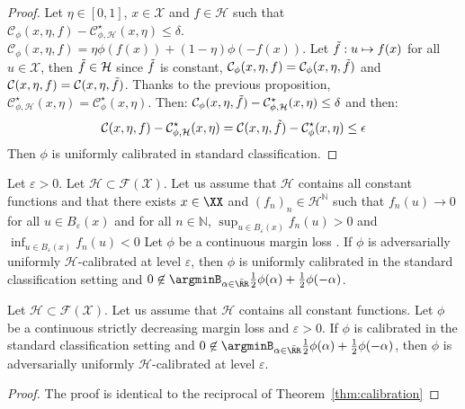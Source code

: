 \begin{proof}
Let $\eta\in[0,1]$, $x\in\mathcal{X}$ and $f\in\mathcal{H}$ such that $ \mathcal{C}_{\phi}(x,\eta,f)- \mathcal{C}^\star_{\phi,\mathcal{H}}(x,\eta)\leq\delta$.  $\mathcal{C}_{\phi}(x,\eta,f) = \eta\phi(f(x))+(1-\eta)\phi(-f(x))$. Let $\Tilde{f}:u\mapsto f(x)$ for all $u\in\mathcal{X}$, then $\Tilde{f}\in\mathcal{H}$ since $\Tilde{f}$ is constant, $\mathcal{C}_{\phi}(x,\eta,f) = \mathcal{C}_{\phi}(x,\eta,\Tilde{f})$ and $\mathcal{C}(x,\eta,f) = \mathcal{C}(x,\eta,\Tilde{f})$. Thanks to the previous proposition, $\mathcal{C}^\star_{\phi,\mathcal{H}}(x,\eta)=\mathcal{C}^\star_{\phi}(x,\eta)$. Then: $ \mathcal{C}_{\phi}(x,\eta,\Tilde{f})-\mathcal{C}^\star_{\phi,\mathcal{H}}(x,\eta)\leq \delta$ and then:
\begin{align*}
    \mathcal{C}(x,\eta,f)-\mathcal{C}^\star_{\phi,\mathcal{H}}(x,\eta) =  \mathcal{C}(x,\eta,\Tilde{f})-\mathcal{C}^\star_{\phi}(x,\eta) \leq \epsilon
\end{align*}
Then $\phi$ is uniformly calibrated in standard classification.
\end{proof}



\begin{prop*} 
 Let $\varepsilon>0$. Let $\mathcal{H}\subset \mathcal{F}(\mathcal{X})$. Let us assume that $\mathcal{H}$ contains all constant functions and that there exists $x\in\XX$ and $(f_n)_n\in\mathcal{H}^\mathbb{N}$ such that $f_n(u)\to 0$ for all $ u\in B_\varepsilon(x)$ and for all $n\in\mathbb{N}$, $\sup_{u\in B_\varepsilon(x)} f_n(u)>0$ and  $\inf_{u\in B_\varepsilon(x)} f_n(u)<0$ 
Let $\phi$  be a continuous margin loss .  If $\phi$ is adversarially uniformly $\mathcal{H}$-calibrated at level $\varepsilon$, then $\phi$ is uniformly calibrated in the standard classification setting and $0\not\in \argminB_{\alpha\in\bar{\RR}}
\frac12\phi(\alpha)+\frac12\phi(-\alpha)$. 

\end{prop*}


\begin{prop*}
Let $\mathcal{H}\subset \mathcal{F}(\mathcal{X})$. Let us assume that $\mathcal{H}$ contains all constant functions.
Let $\phi$  be a continuous strictly decreasing margin loss and $\varepsilon>0$. If $\phi$ is calibrated in the standard classification setting and $0\not\in \argminB_{\alpha\in\bar{\RR}}
\frac12\phi(\alpha)+\frac12\phi(-\alpha)$, then $\phi$ is adversarially uniformly $\mathcal{H}$-calibrated at level $\varepsilon$.

\begin{proof}
The proof is identical to the reciprocal of Theorem~\ref{thm:calibration}
\end{proof}


\end{prop*}

\begin{example}
\end{example}